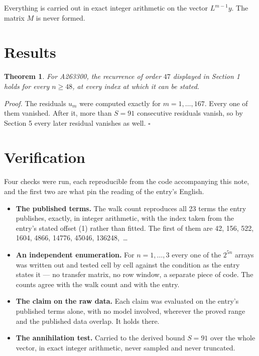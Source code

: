 \documentclass[11pt]{article}
\newtheorem{theorem}{Theorem}
\theoremstyle{definition}
\begin{document}
Everything is carried out in exact integer arithmetic on the vector $L^{m-1}y$. The matrix $M$ is never formed.

\section{Results}

\begin{theorem} For A263300, the recurrence of order $47$ displayed in Section 1 holds for every $n \ge 48$, at every index at which it can be stated.\end{theorem}

{\itshape Proof.} The residuals $u_m$ were computed exactly for $m = 1,\dots,167$. Every one of them vanished. After it, more than $S = 91$ consecutive residuals vanish, so by Section 5 every later residual vanishes as well. $\square$

\section{Verification}

Four checks were run, each reproducible from the code accompanying this note, and the first two are what pin the reading of the entry's English.

\begin{itemize}

\item {\bfseries The published terms.} The walk count reproduces all 23 terms the entry publishes, exactly, in integer arithmetic, with the index taken from the entry's stated offset (1) rather than fitted. The first of them are 42, 156, 522, 1604, 4866, 14776, 45046, 136248,~\dots

\item {\bfseries An independent enumeration.} For $n = 1,\dots,3$ every one of the $2^{5n}$ arrays was written out and tested cell by cell against the condition as the entry states it --- no transfer matrix, no row window, a separate piece of code. The counts agree with the walk count and with the entry.

\item {\bfseries The claim on the raw data.} Each claim was evaluated on the entry's published terms alone, with no model involved, wherever the proved range and the published data overlap. It holds there.

\item {\bfseries The annihilation test.} Carried to the derived bound $S = 91$ over the whole vector, in exact integer arithmetic, never sampled and never truncated.

\end{itemize}
\end{document}
